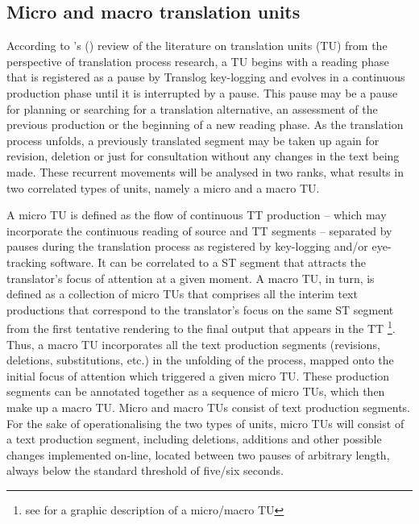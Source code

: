 \documentclass[output=paper]{LSP/langsci}
\begin{document}
\subsection{Micro and macro translation units}\label{sec:alves:2.1}

According to \citeauthor{AlvesVale2009}'s (\citeyear{AlvesVale2009}) review of the literature on translation units (TU) from the perspective of translation process research, a TU begins with a reading phase that is registered as a pause by Translog key-logging and evolves in a continuous production phase until it is interrupted by a pause. This pause may be a pause for planning or searching for a translation alternative, an assessment of the previous production or the beginning of a new reading phase. As the translation process unfolds, a previously translated segment may be taken up again for revision, deletion or just for consultation without any changes in the text being made. These recurrent movements will be analysed in two ranks, what results in two correlated types of units, namely a micro and a macro TU.

\newpage 
A micro TU is defined as the flow of continuous TT production -- which may incorporate the continuous reading of source and TT segments -- separated by pauses during the translation process as registered by key-logging and/or eye-tracking software. It can be correlated to a ST segment that attracts the translator's focus of attention at a given moment. A macro TU, in turn, is defined as a collection of micro TUs that comprises all the interim text productions that correspond to the translator's focus on the same ST segment from the first tentative rendering to the final output that appears in the TT \footnote{see \cite[261]{AlvesVale2009} for a graphic description of a micro/macro TU}. Thus, a macro TU incorporates all the text production segments (revisions, deletions, substitutions, etc.) in the unfolding of the process, mapped onto the initial focus of attention which triggered a given micro TU. These production segments can be annotated together as a sequence of micro TUs, which then make up a macro TU. Micro and macro TUs consist of text production segments. For the sake of operationalising the two types of units, micro TUs will consist of a text production segment, including deletions, additions and other possible changes implemented on-line, located between two pauses of arbitrary length, always below the standard threshold of five/six seconds. 
\end{document}
